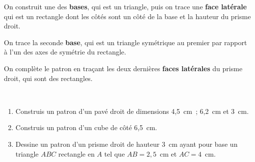 \begin{methode*1}
\begin{exemple*1}
 \begin{minipage}[t]{0.3\linewidth}      
On construit une des \textcolor{C2}{\textbf{bases}}, qui est un triangle, puis on trace une \textcolor{H2}{\textbf{face latérale}} qui est un rectangle dont les côtés sont un côté de la base et la hauteur du prisme droit.
  \end{minipage} \hfill%
  \begin{minipage}[t]{0.3\linewidth}
On trace la seconde \textcolor{C2}{\textbf{base}}, qui est un triangle symétrique au premier par rapport à l'un des axes de symétrie du rectangle.
  \end{minipage} \hfill%
   \begin{minipage}[t]{0.3\linewidth}   
On complète le patron en traçant les deux dernières \textcolor{U1}{\textbf{faces latérales}} du prisme droit, qui sont des rectangles.
   \end{minipage} \\
 \end{exemple*1}

 \exercice  
\begin{enumerate}
\item Construis un patron d'un pavé droit de dimensions 4,5 cm ; 6,2 cm et 3 cm.
\item Construis un patron d'un cube de côté 6,5 cm.
\item Dessine un patron d'un prisme droit de hauteur 3 cm ayant pour base un triangle $ABC$ rectangle en $A$ tel que $AB = 2,5$ cm et $AC = 4$ cm.
\end{enumerate}





 \end{methode*1}
 
 
